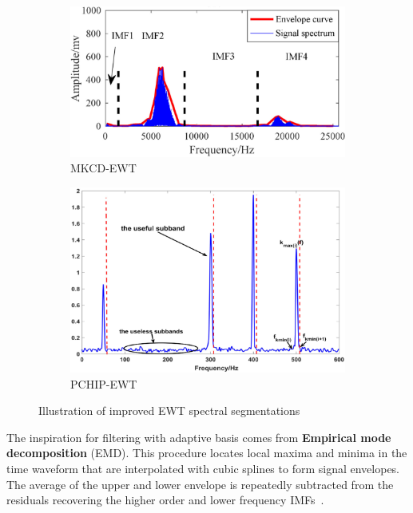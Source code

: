 \begin{figure}[ht]
    \centering
    \begin{subfigure}[b]{0.49\textwidth}
        \includegraphics[width=\textwidth]{assets/MKCD-EWT.png}
        \caption{MKCD-EWT~\cite{li_fault_2019}}
        \label{fig:mkcd-ewt-segmentation}
    \end{subfigure}
    \hfill
    \begin{subfigure}[b]{0.49\textwidth}
        \includegraphics[width=\textwidth]{assets/PCHIP-EWT.png}
        \caption{PCHIP-EWT~\cite{zhuang_improved_2020}}
        \label{fig:pchip-ewt-segmentation}
    \end{subfigure}
    \caption{Illustration of improved EWT spectral segmentations}
\end{figure}

The inspiration for filtering with adaptive basis comes from \textbf{Empirical mode decomposition} (EMD). This procedure locates local maxima and minima in the time waveform that are interpolated with cubic splines to form signal envelopes. The average of the upper and lower envelope is repeatedly subtracted from the residuals recovering the higher order and lower frequency IMFs~\cite{wang_computational_2014}. 

